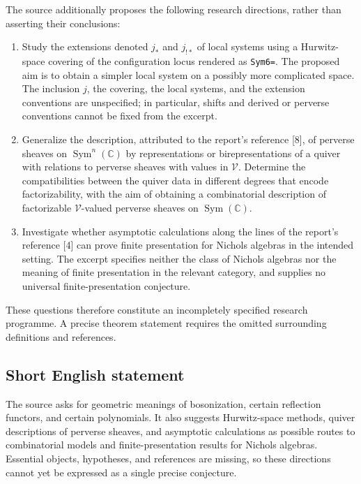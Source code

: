 \documentclass[11pt]{article}
\newcommand{\C}{\mathbb{C}}
\begin{document}
The source additionally proposes the following research directions, rather than asserting their conclusions:
\begin{enumerate}
\item Study the extensions denoted \(j_*\) and \(j_{!*}\) of local systems using a Hurwitz-space covering of the configuration locus rendered as \texttt{Sym6=}. The proposed aim is to obtain a simpler local system on a possibly more complicated space. The inclusion \(j\), the covering, the local systems, and the extension conventions are unspecified; in particular, shifts and derived or perverse conventions cannot be fixed from the excerpt.
\item Generalize the description, attributed to the report's reference [8], of perverse sheaves on \(\operatorname{Sym}^{n}(\C)\) by representations or birepresentations of a quiver with relations to perverse sheaves with values in \(\mathcal V\). Determine the compatibilities between the quiver data in different degrees that encode factorizability, with the aim of obtaining a combinatorial description of factorizable \(\mathcal V\)-valued perverse sheaves on \(\operatorname{Sym}(\C)\).
\item Investigate whether asymptotic calculations along the lines of the report's reference [4] can prove finite presentation for Nichols algebras in the intended setting. The excerpt specifies neither the class of Nichols algebras nor the meaning of finite presentation in the relevant category, and supplies no universal finite-presentation conjecture.
\end{enumerate}
These questions therefore constitute an incompletely specified research programme. A precise theorem statement requires the omitted surrounding definitions and references.
\subsection{Short English statement}
The source asks for geometric meanings of bosonization, certain reflection functors, and certain polynomials. It also suggests Hurwitz-space methods, quiver descriptions of perverse sheaves, and asymptotic calculations as possible routes to combinatorial models and finite-presentation results for Nichols algebras. Essential objects, hypotheses, and references are missing, so these directions cannot yet be expressed as a single precise conjecture.
\end{document}
